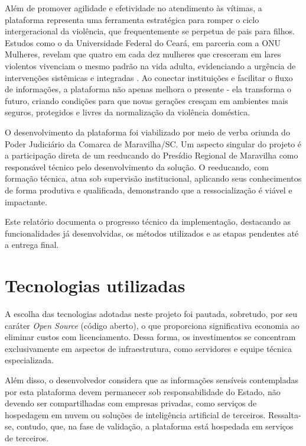 \par Além de promover agilidade e efetividade no atendimento às vítimas, a plataforma representa uma ferramenta estratégica para romper o ciclo intergeracional da violência, que frequentemente se perpetua de pais para filhos. Estudos como o da Universidade Federal do Ceará, em parceria com a ONU Mulheres, revelam que quatro em cada dez mulheres que cresceram em lares violentos vivenciam o mesmo padrão na vida adulta, evidenciando a urgência de intervenções sistêmicas e integradas \cite{carvalho2017transmissao}. Ao conectar instituições e facilitar o fluxo de informações, a plataforma não apenas melhora o presente - ela transforma o futuro, criando condições para que novas gerações cresçam em ambientes mais seguros, protegidos e livres da normalização da violência doméstica.


\par O desenvolvimento da plataforma foi viabilizado por meio de verba oriunda do Poder Judiciário da Comarca de Maravilha/SC. Um aspecto singular do projeto é a participação direta de um reeducando do Presídio Regional de Maravilha como responsável técnico pelo desenvolvimento da solução. O reeducando, com formação técnica, atua sob supervisão institucional, aplicando seus conhecimentos de forma produtiva e qualificada, demonstrando que a ressocialização é viável e impactante.

\par Este relatório documenta o progresso técnico da implementação, destacando as funcionalidades já desenvolvidas, os métodos utilizados e as etapas pendentes até a entrega final.

\section{Tecnologias utilizadas}
\par A escolha das tecnologias adotadas neste projeto foi pautada, sobretudo, por seu caráter \textit{Open Source} (código aberto), o que proporciona significativa economia ao eliminar custos com licenciamento. Dessa forma, os investimentos se concentram exclusivamente em aspectos de infraestrutura, como servidores e equipe técnica especializada.
\par Além disso, o desenvolvedor considera que as informações sensíveis contempladas por esta plataforma devem permanecer sob responsabilidade do Estado, não devendo ser compartilhadas com empresas privadas, como serviços de hospedagem em nuvem ou soluções de inteligência artificial de terceiros. Ressalta-se, contudo, que, na fase de validação, a plataforma está hospedada em serviços de terceiros.

